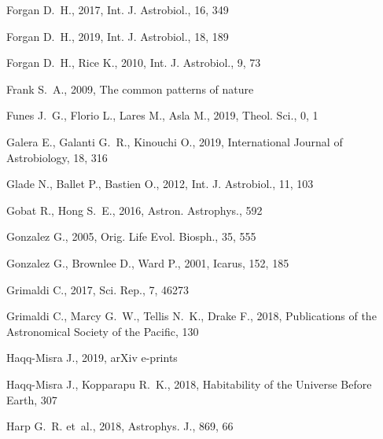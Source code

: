 \documentclass[crop]{CSLB}
\begin{document}
\begin{thebibliography}{90}
Forgan D.~H., 2017{}, Int. J. Astrobiol., 16, 349

Forgan D.~H., 2019, Int. J. Astrobiol., 18, 189

Forgan D.~H., Rice K., 2010, Int. J. Astrobiol., 9, 73

Frank S.~A., 2009, {The common patterns of nature}

Funes J.~G., Florio L., Lares M., Asla M., 2019, Theol. Sci., 0, 1

Galera E., Galanti G.~R., Kinouchi O., 2019, International Journal of
  Astrobiology, 18, 316

Glade N., Ballet P., Bastien O., 2012, Int. J. Astrobiol., 11, 103

Gobat R., Hong S.~E., 2016, Astron. Astrophys., 592

Gonzalez G., 2005, Orig. Life Evol. Biosph., 35, 555

Gonzalez G., Brownlee D., Ward P., 2001, Icarus, 152, 185

Grimaldi C., 2017, Sci. Rep., 7, 46273

Grimaldi C., Marcy G.~W., Tellis N.~K., Drake F., 2018, Publications of the
  Astronomical Society of the Pacific, 130

Haqq-Misra J., 2019, arXiv e-prints

Haqq-Misra J., Kopparapu R.~K., 2018, Habitability of the Universe Before
  Earth, 307

Harp G.~R. {et~al.}, 2018, Astrophys. J., 869, 66


\end{thebibliography}
\end{document}
